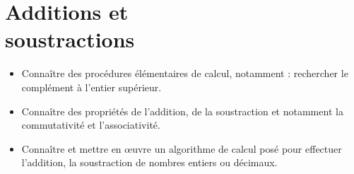 \themaN
\graphicspath{{../Ch12_Additions_et_soustractions/Images/}}

\chapter{Additions et\\soustractions}
\label{C08}


\begin{prerequis}
   \begin{itemize}
      \item Connaître des procédures élémentaires de calcul, notamment : rechercher le complément à l’entier supérieur.
      \item Connaître des propriétés de l’addition, de la soustraction et notamment la commutativité et l'associativité.
      \item Connaître et mettre en œuvre un algorithme de calcul posé pour effectuer l’addition, la soustraction de nombres entiers ou décimaux.
   \end{itemize}
\end{prerequis}

\vfill

